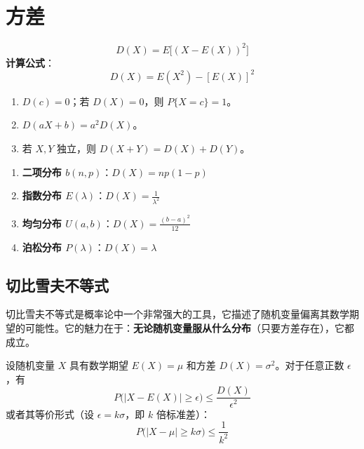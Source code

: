 \section{方差}
\begin{definition}[方差]
\begin{equation}
	D(X) = E\big[(X - E(X))^{2}\big]
	\label{eq:第四章:方差定义}
\end{equation}
\textbf{计算公式}：
\begin{equation}
	D(X) = E(X^{2}) - [E(X)]^{2}
	\label{eq:第四章:方差计算}
\end{equation}
\end{definition}

\begin{property}[方差的性质]
\begin{enumerate}
	\item $D(c) = 0$；若 $D(X) = 0$，则 $P\{X = c\} = 1$。
	\item $D(aX + b) = a^{2} D(X)$。
	\item 若 $X, Y$ 独立，则 $D(X + Y) = D(X) + D(Y)$。
\end{enumerate}
\end{property}

\begin{keybox}[重要 r.v. 的方差]
\begin{enumerate}
	\item \textbf{二项分布 $b(n, p)$}：$D(X) = n p (1-p)$
	\item \textbf{指数分布 $E(\lambda)$}：$D(X) = \frac{1}{\lambda^{2}}$
	\item \textbf{均匀分布 $U(a, b)$}：$D(X) = \frac{(b-a)^2}{12}$
	\item \textbf{泊松分布 $P(\lambda)$}：$D(X) = \lambda$
\end{enumerate}
\end{keybox}

\subsection{切比雪夫不等式}
\begin{theorem}
切比雪夫不等式是概率论中一个非常强大的工具，它描述了随机变量偏离其数学期望的可能性。它的魅力在于：\textbf{无论随机变量服从什么分布}（只要方差存在），它都成立。

设随机变量 $X$ 具有数学期望 $E(X) = \mu$ 和方差 $D(X) = \sigma^2$。对于任意正数 $\epsilon$，有
\begin{equation}
	P\big(|X - E(X)| \ge \epsilon\big) \le \frac{D(X)}{\epsilon^2}
	\label{eq:第四章:切比雪夫}
\end{equation}
或者其等价形式（设 $\epsilon = k\sigma$，即 $k$ 倍标准差）：
\begin{equation}
	P\big(|X - \mu| \ge k\sigma\big) \le \frac{1}{k^2}
	\label{eq:第四章:切比雪夫等价}
\end{equation}
\end{theorem}


